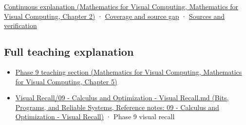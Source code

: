 \href{../02-Mathematics-for-Visual-Computing/main.pdf\#nameddest=01-foundations-i-ch018-keep-the-promises-visible-while-moving-between-representations}{Continuous explanation (Mathematics for Visual Computing, Mathematics for Visual Computing, Chapter 2)} · \hyperref[appendix-fd090d982a15-phase-7---parts-601-700]{Coverage and source gap} · \hyperref[appendix-a103e7846d21-phase-7---source-analysis-and-verification]{Sources and verification}

\subsection{Full teaching explanation}\label{appendix-ab31ef447dbf-full-teaching-explanation}

\begin{itemize}
\tightlist
\item
  \href{../02-Mathematics-for-Visual-Computing/main.pdf\#nameddest=02-foundations-ii-ch021-jacobians-curvature-and-local-approximation}{Phase 9 teaching section (Mathematics for Visual Computing, Mathematics for Visual Computing, Chapter 5)}
\item
  \href{../01-Bits-Programs-and-Reliable-Systems/main.pdf\#nameddest=appendix-adf48f5dc5c1}{Visual Recall/09 - Calculus and Optimization - Visual Recall.md (Bits, Programs, and Reliable Systems, Reference notes: 09 - Calculus and Optimization - Visual Recall)} · Phase 9 visual recall
\end{itemize}
